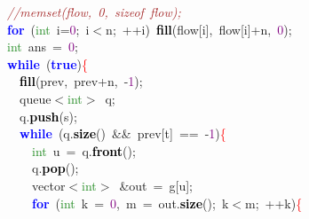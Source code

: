 {{\mbox{}\ \ \textit{\textcolor{Brown}{//memset(flow,\ 0,\ sizeof\ flow);}} \\
\mbox{}\ \ \textbf{\textcolor{Blue}{for}}\ \textcolor{BrickRed}{(}\textcolor{ForestGreen}{int}\ i\textcolor{BrickRed}{=}\textcolor{Purple}{0}\textcolor{BrickRed}{;}\ i\textcolor{BrickRed}{$<$}n\textcolor{BrickRed}{;}\ \textcolor{BrickRed}{++}i\textcolor{BrickRed}{)}\ \textbf{\textcolor{Black}{fill}}\textcolor{BrickRed}{(}flow\textcolor{BrickRed}{[}i\textcolor{BrickRed}{],}\ flow\textcolor{BrickRed}{[}i\textcolor{BrickRed}{]+}n\textcolor{BrickRed}{,}\ \textcolor{Purple}{0}\textcolor{BrickRed}{);} \\
\mbox{}\ \ \textcolor{ForestGreen}{int}\ ans\ \textcolor{BrickRed}{=}\ \textcolor{Purple}{0}\textcolor{BrickRed}{;} \\
\mbox{}\ \ \textbf{\textcolor{Blue}{while}}\ \textcolor{BrickRed}{(}\textbf{\textcolor{Blue}{true}}\textcolor{BrickRed}{)}\textcolor{Red}{\{} \\
\mbox{}\ \ \ \ \textbf{\textcolor{Black}{fill}}\textcolor{BrickRed}{(}prev\textcolor{BrickRed}{,}\ prev\textcolor{BrickRed}{+}n\textcolor{BrickRed}{,}\ \textcolor{BrickRed}{-}\textcolor{Purple}{1}\textcolor{BrickRed}{);} \\
\mbox{}\ \ \ \ queue\textcolor{BrickRed}{$<$}\textcolor{ForestGreen}{int}\textcolor{BrickRed}{$>$}\ q\textcolor{BrickRed}{;} \\
\mbox{}\ \ \ \ q\textcolor{BrickRed}{.}\textbf{\textcolor{Black}{push}}\textcolor{BrickRed}{(}s\textcolor{BrickRed}{);} \\
\mbox{}\ \ \ \ \textbf{\textcolor{Blue}{while}}\ \textcolor{BrickRed}{(}q\textcolor{BrickRed}{.}\textbf{\textcolor{Black}{size}}\textcolor{BrickRed}{()}\ \textcolor{BrickRed}{\&\&}\ prev\textcolor{BrickRed}{[}t\textcolor{BrickRed}{]}\ \textcolor{BrickRed}{==}\ \textcolor{BrickRed}{-}\textcolor{Purple}{1}\textcolor{BrickRed}{)}\textcolor{Red}{\{} \\
\mbox{}\ \ \ \ \ \ \textcolor{ForestGreen}{int}\ u\ \textcolor{BrickRed}{=}\ q\textcolor{BrickRed}{.}\textbf{\textcolor{Black}{front}}\textcolor{BrickRed}{();} \\
\mbox{}\ \ \ \ \ \ q\textcolor{BrickRed}{.}\textbf{\textcolor{Black}{pop}}\textcolor{BrickRed}{();} \\
\mbox{}\ \ \ \ \ \ vector\textcolor{BrickRed}{$<$}\textcolor{ForestGreen}{int}\textcolor{BrickRed}{$>$}\ \textcolor{BrickRed}{\&}out\ \textcolor{BrickRed}{=}\ g\textcolor{BrickRed}{[}u\textcolor{BrickRed}{];} \\
\mbox{}\ \ \ \ \ \ \textbf{\textcolor{Blue}{for}}\ \textcolor{BrickRed}{(}\textcolor{ForestGreen}{int}\ k\ \textcolor{BrickRed}{=}\ \textcolor{Purple}{0}\textcolor{BrickRed}{,}\ m\ \textcolor{BrickRed}{=}\ out\textcolor{BrickRed}{.}\textbf{\textcolor{Black}{size}}\textcolor{BrickRed}{();}\ k\textcolor{BrickRed}{$<$}m\textcolor{BrickRed}{;}\ \textcolor{BrickRed}{++}k\textcolor{BrickRed}{)}\textcolor{Red}{\{} \\
}}
